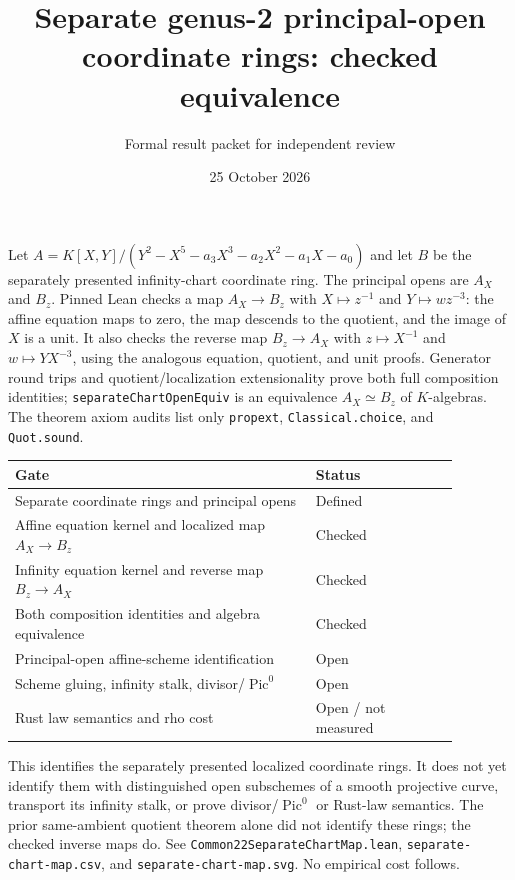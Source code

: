 \documentclass[11pt]{article}
\title{Separate genus-2 principal-open coordinate rings: checked equivalence}
\author{Formal result packet for independent review}
\date{25 October 2026}
\begin{document}
\maketitle
Let $A=K[X,Y]/(Y^2-X^5-a_3X^3-a_2X^2-a_1X-a_0)$ and let $B$ be the separately
presented infinity-chart coordinate ring. The principal opens are $A_X$ and
$B_z$. Pinned Lean checks a map $A_X\to B_z$ with $X\mapsto z^{-1}$ and
$Y\mapsto wz^{-3}$: the affine equation maps to zero, the map descends to the
quotient, and the image of $X$ is a unit. It also checks the reverse map
$B_z\to A_X$ with $z\mapsto X^{-1}$ and $w\mapsto YX^{-3}$, using the
analogous equation, quotient, and unit proofs. Generator round trips and
quotient/localization extensionality prove both full composition identities;
\texttt{separateChartOpenEquiv} is an equivalence $A_X\simeq B_z$ of $K$-algebras.
The theorem axiom audits list only \texttt{propext}, \texttt{Classical.choice},
and \texttt{Quot.sound}.

\begin{center}\begin{tabular}{p{0.59\linewidth}p{0.29\linewidth}}\toprule
Gate & Status\\\midrule
Separate coordinate rings and principal opens & Defined\\
Affine equation kernel and localized map $A_X\to B_z$ & Checked\\
Infinity equation kernel and reverse map $B_z\to A_X$ & Checked\\
Both composition identities and algebra equivalence & Checked\\
Principal-open affine-scheme identification & Open\\
Scheme gluing, infinity stalk, divisor/$\operatorname{Pic}^0$ & Open\\
Rust law semantics and rho cost & Open / not measured\\\bottomrule\end{tabular}\end{center}

\noindent This identifies the separately presented localized coordinate rings.
It does not yet identify them with distinguished open subschemes of a smooth
projective curve, transport its infinity stalk, or prove divisor/$\operatorname{Pic}^0$
or Rust-law semantics. The prior same-ambient quotient theorem alone did not
identify these rings; the checked inverse maps do. See
\texttt{Common22SeparateChartMap.lean}, \texttt{separate-chart-map.csv}, and
\texttt{separate-chart-map.svg}. No empirical cost follows.
\end{document}

